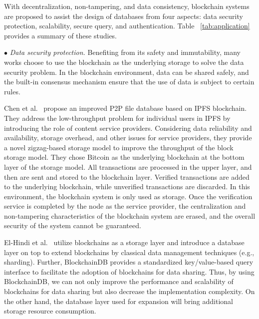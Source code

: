\documentclass[acmsmall]{acmart}
\begin{document}
With decentralization, non-tampering, and data consistency, blockchain systems are proposed to assist the design of databases from four aspects: data security protection, scalability, secure query, and authentication. Table ~\ref{tab:application} provides a summary of these studies.


$\bullet$ {\it Data security protection.}
Benefiting from its safety and immutability, many works choose to use the blockchain as the underlying storage to solve the data security problem. In the blockchain environment, data can be shared safely, and the built-in consensus mechanism ensure that the use of data is subject to certain rules.


Chen et al.~\cite{chen2017improved} propose an improved P2P file database based on IPFS blockchain. They address the low-throughput problem for individual users in IPFS by introducing the role of content service providers. Considering data reliability and availability, storage overhead, and other issues for service providers, they provide a novel zigzag-based storage model to improve the throughput of the block storage model. They chose Bitcoin as the underlying blockchain at the bottom layer of the storage model. All transactions are processed in the upper layer, and then are sent and stored to the blockchain layer. Verified transactions are added to the underlying blockchain, while unverified transactions are discarded.
In this environment, the blockchain system is only used as storage. Once the verification service is completed by the node as the service provider, the centralization and non-tampering characteristics of the blockchain system are erased, and the overall security of the system cannot be guaranteed.



El-Hindi et al.~\cite{el2019blockchaindb} utilize blockchains as a storage layer and introduce a database layer on top to extend blockchains by classical data management techniques (e.g., sharding). Further, BlockchainDB provides a standardized key/value-based query interface to facilitate the adoption of blockchains for data sharing. Thus, by using BlockchainDB, we can not only improve the performance and scalability of blockchains for data sharing but also decrease the implementation complexity. 
On the other hand, the database layer used for expansion will bring additional storage resource consumption.
\end{document}
